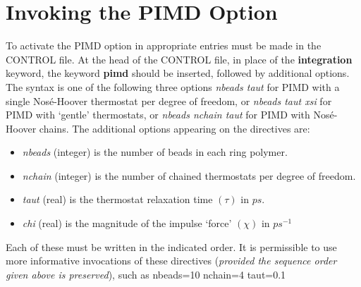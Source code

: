 \section{Invoking the PIMD Option}

To activate the PIMD option in \D{} appropriate entries must be made
in the CONTROL file. At the head of the CONTROL file, in place of the
{\bf integration} keyword, the keyword {\bf pimd} should be inserted,
followed by additional options. The syntax is one of the following
three options\newline
\newline
{} {\em nbeads taut} \newline
\newline
\noindent for PIMD with a single Nos\'{e}-Hoover thermostat per degree of freedom, or \newline
\newline
{} {\em nbeads taut xsi} \newline
\newline
\noindent for PIMD with `gentle' thermostats, or \newline
\newline
{} {\em nbeads nchain taut} \newline
\newline    
\noindent for PIMD with Nos\'{e}-Hoover chains. \newline
\newline
The additional options appearing on the directives are:
\begin{itemize}
\item {\em nbeads} (integer) is the number of beads in each ring polymer.
\item {\em nchain} (integer) is the number of chained thermostats per degree of freedom.
\item {\em taut} (real) is the thermostat relaxation time $(\tau)$ in $ps$.
\item {\em chi} (real) is the magnitude of the impulse `force' $(\chi)$ in $ps^{-1}$
\end{itemize}
\noindent Each of these must be written in the indicated order. It is
permissible to use more informative invocations of these directives
({\em provided the sequence order given above is preserved}), such
as \newline
\newline
{} nbeads=10 nchain=4 taut=0.1  \newline
\newline
